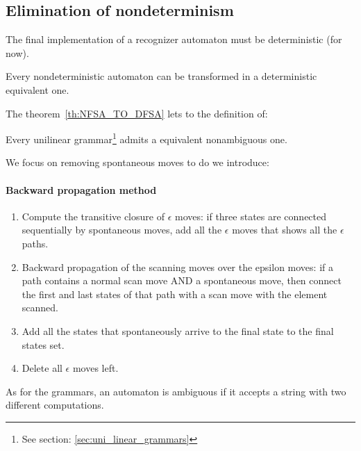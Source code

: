 		\subsection{Elimination of nondeterminism}
			The final implementation of a recognizer automaton must be deterministic (for now).
			\begin{theorem}\label{th:NFSA_TO_DFSA}
				Every nondeterministic automaton can be transformed in a deterministic equivalent one.
			\end{theorem}
			The theorem~\ref{th:NFSA_TO_DFSA} lets to the definition of:
			\begin{corollary}
				Every unilinear grammar\footnote{See section: \ref{sec:uni_linear_grammars}}  admits a equivalent nonambiguous one.
			\end{corollary}
			We focus on removing spontaneous moves to do we introduce:
			\paragraph{Backward propagation method}
				\begin{enumerate}
					\item Compute the transitive closure of $\epsilon$ moves: if three states are connected sequentially by spontaneous moves, add all the $\epsilon$ 
					moves that shows all the $\epsilon$ paths.
					\item Backward propagation of the scanning moves over the epsilon moves: if a path contains a normal scan move AND a spontaneous move, then 
					connect the first and last states of that path with a scan move with the element scanned.
					\item Add all the states that spontaneously arrive to the final state to the final states set.
					\item Delete all $\epsilon$ moves left.
				\end{enumerate}
				
			\begin{definition}[Ambiguity]
				As for the grammars, an automaton is ambiguous if it accepts a string with two different computations. 
			\end{definition}
	
